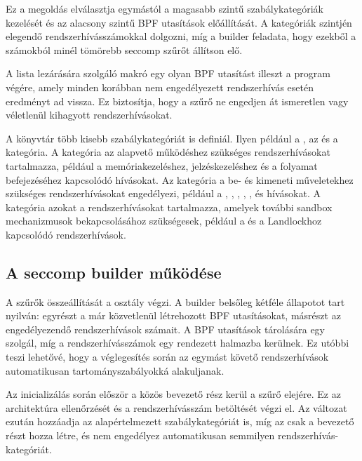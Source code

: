 Ez a megoldás elválasztja egymástól a magasabb szintű szabálykategóriák
kezelését és az alacsony szintű BPF utasítások előállítását. A kategóriák
szintjén elegendő rendszerhívásszámokkal dolgozni, míg a builder feladata, hogy
ezekből a számokból minél tömörebb seccomp szűrőt állítson elő.

A lista lezárására szolgáló  makró egy olyan BPF
utasítást illeszt a program végére, amely minden korábban nem engedélyezett
rendszerhívás esetén  eredményt ad vissza.
Ez biztosítja, hogy a szűrő ne engedjen át ismeretlen vagy véletlenül kihagyott
rendszerhívásokat.

A könyvtár
több kisebb szabálykategóriát is definiál. Ilyen például a ,
az  és a  kategória. A  kategória az
alapvető működéshez szükséges rendszerhívásokat tartalmazza, például a
memóriakezeléshez, jelzéskezeléshez és a folyamat befejezéséhez kapcsolódó
hívásokat. Az  kategória a be- és kimeneti műveletekhez szükséges
rendszerhívásokat engedélyezi, például a , ,
, , ,  és
 hívásokat. A  kategória azokat a
rendszerhívásokat tartalmazza, amelyek további sandbox mechanizmusok
bekapcsolásához szükségesek, például a  és a Landlockhoz
kapcsolódó rendszerhívások.

\subsection{A seccomp builder működése}

A szűrők összeállítását a  osztály végzi. A builder
belsőleg kétféle állapotot tart nyilván: egyrészt a már közvetlenül létrehozott
BPF utasításokat, másrészt az engedélyezendő rendszerhívások számait. A BPF
utasítások tárolására egy  szolgál, míg a rendszerhívásszámok
egy rendezett halmazba kerülnek. Ez utóbbi teszi lehetővé, hogy a véglegesítés
során az egymást követő rendszerhívások automatikusan tartományszabályokká
alakuljanak.

Az inicializálás során először a közös bevezető rész kerül a szűrő elejére. Ez
az architektúra ellenőrzését és a rendszerhívásszám betöltését végzi el. Az
 változat ezután hozzáadja az alapértelmezett 
szabálykategóriát is, míg az  csak a
bevezető részt hozza létre, és nem engedélyez automatikusan semmilyen
rendszerhívás-kategóriát.

